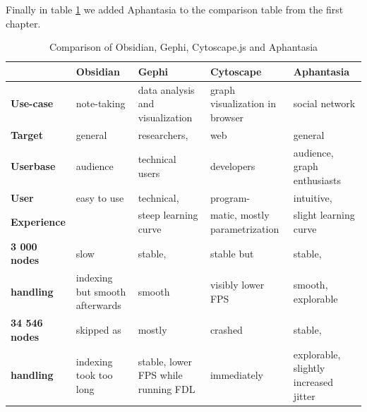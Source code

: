 Finally in table \ref{tab:comparison_2} we added Aphantasia to the comparison table from the first chapter.

\begin{table}[ht]
    \centering
    \caption{Comparison of Obsidian, Gephi, Cytoscape.js and Aphantasia}
    \label{tab:comparison_2}
    \begin{tabularx}{\textwidth}{|l|X|X|X|X|}
      \hline
      \textbf{}                     & \textbf{Obsidian}       & \textbf{Gephi}                      & \textbf{Cytoscape}                & \textbf{Aphantasia} \\ \hline
      \textbf{Use-case}             & note-taking             & data analysis and visualization     & graph visualization in browser    & social network \\ \hline
      \textbf{Target}               & general                 & researchers,                        & web                               & general \\ 
      \textbf{Userbase}             &  audience               & technical users                     & developers                        & audience, graph enthusiasts \\ \hline
      \textbf{User}                 & easy to use             & technical,                          & program-                          & intuitive, \\
      \textbf{Experience}           &                         & steep learning curve                & matic, mostly parametrization     & slight learning curve\\ \hline
      \textbf{3 000 nodes}          & slow                    & stable,                             & stable but                        & stable, \\ 
      \textbf{handling}             & indexing but smooth afterwards & smooth                              & visibly lower FPS                 & smooth, explorable \\ \hline
      \textbf{34 546 nodes}         & skipped as              & mostly                              & crashed                           & stable, \\ 
      \textbf{handling}             & indexing took too long  & stable, lower FPS while running FDL & immediately                       & explorable, slightly increased jitter \\ \hline
    \end{tabularx}
  \end{table}